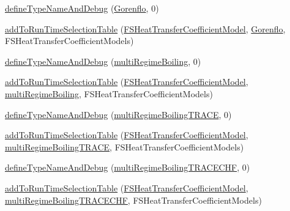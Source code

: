 \begin{DoxyCompactItemize}
\item 
\hyperlink{namespaceFoam_1_1FSHeatTransferCoefficientModels_af45fd09a359594abd439c3cb7bb5cd5e}{define\+Type\+Name\+And\+Debug} (\hyperlink{classFoam_1_1FSHeatTransferCoefficientModels_1_1Gorenflo}{Gorenflo}, 0)
\item 
\hyperlink{namespaceFoam_1_1FSHeatTransferCoefficientModels_a9511f2b3599fcdf4ddea2e7ac013cf23}{add\+To\+Run\+Time\+Selection\+Table} (\hyperlink{classFoam_1_1FSHeatTransferCoefficientModel}{F\+S\+Heat\+Transfer\+Coefficient\+Model}, \hyperlink{classFoam_1_1FSHeatTransferCoefficientModels_1_1Gorenflo}{Gorenflo}, F\+S\+Heat\+Transfer\+Coefficient\+Models)
\item 
\hyperlink{namespaceFoam_1_1FSHeatTransferCoefficientModels_a2a5baf11cec096ace64041076b7995cf}{define\+Type\+Name\+And\+Debug} (\hyperlink{classFoam_1_1FSHeatTransferCoefficientModels_1_1multiRegimeBoiling}{multi\+Regime\+Boiling}, 0)
\item 
\hyperlink{namespaceFoam_1_1FSHeatTransferCoefficientModels_a662cd807b9e77a965b5cc0e6c3bc9c10}{add\+To\+Run\+Time\+Selection\+Table} (\hyperlink{classFoam_1_1FSHeatTransferCoefficientModel}{F\+S\+Heat\+Transfer\+Coefficient\+Model}, \hyperlink{classFoam_1_1FSHeatTransferCoefficientModels_1_1multiRegimeBoiling}{multi\+Regime\+Boiling}, F\+S\+Heat\+Transfer\+Coefficient\+Models)
\item 
\hyperlink{namespaceFoam_1_1FSHeatTransferCoefficientModels_a702873ad05c0abe544fc95229f5b8a01}{define\+Type\+Name\+And\+Debug} (\hyperlink{classFoam_1_1FSHeatTransferCoefficientModels_1_1multiRegimeBoilingTRACE}{multi\+Regime\+Boiling\+T\+R\+A\+CE}, 0)
\item 
\hyperlink{namespaceFoam_1_1FSHeatTransferCoefficientModels_ae09a6dcc73c9f55ed1e846b2526646ee}{add\+To\+Run\+Time\+Selection\+Table} (\hyperlink{classFoam_1_1FSHeatTransferCoefficientModel}{F\+S\+Heat\+Transfer\+Coefficient\+Model}, \hyperlink{classFoam_1_1FSHeatTransferCoefficientModels_1_1multiRegimeBoilingTRACE}{multi\+Regime\+Boiling\+T\+R\+A\+CE}, F\+S\+Heat\+Transfer\+Coefficient\+Models)
\item 
\hyperlink{namespaceFoam_1_1FSHeatTransferCoefficientModels_a5e47db5590fc4ed586425194968bd442}{define\+Type\+Name\+And\+Debug} (\hyperlink{classFoam_1_1FSHeatTransferCoefficientModels_1_1multiRegimeBoilingTRACECHF}{multi\+Regime\+Boiling\+T\+R\+A\+C\+E\+C\+HF}, 0)
\item 
\hyperlink{namespaceFoam_1_1FSHeatTransferCoefficientModels_a1ce54be454a517b0547d34a72c34d8e1}{add\+To\+Run\+Time\+Selection\+Table} (\hyperlink{classFoam_1_1FSHeatTransferCoefficientModel}{F\+S\+Heat\+Transfer\+Coefficient\+Model}, \hyperlink{classFoam_1_1FSHeatTransferCoefficientModels_1_1multiRegimeBoilingTRACECHF}{multi\+Regime\+Boiling\+T\+R\+A\+C\+E\+C\+HF}, F\+S\+Heat\+Transfer\+Coefficient\+Models)

\end{DoxyCompactItemize}
